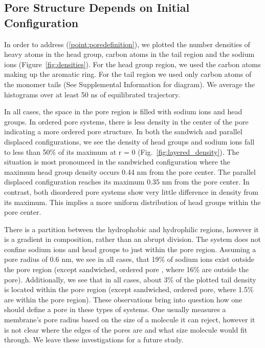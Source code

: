 \documentclass{article}
\begin{document}
  \subsection{Pore Structure Depends on Initial Configuration}  %

  In order to address (\ref{point:poredefinition}), we plotted the number
  densities of heavy atoms in the head group, carbon atoms in the tail region
  and the sodium ions (Figure~\ref{fig:densities}). For the head group region,
  we used the carbon atoms making up the aromatic ring. For the tail region we
  used only carbon atoms of the monomer tails (See Supplemental Information for
  diagram). We average the histograms over at least 50 ns of equilibrated trajectory.

  In all cases, the space in the pore region is filled with sodium ions and
  head groups. In ordered pore systems, there is less density in the center of
  the pore indicating a more ordered pore structure. In both the sandwich and
  parallel displaced configurations, we see the density of head groups and sodium
  ions fall to less than 50\% of its maximum at r = 0
  (Fig.~\ref{fig:layered_density}). The situation is most pronounced in the
  sandwiched configuration where the maximum head group density occurs 0.44 nm
  from the pore center. The parallel displaced configuration reaches its maximum
  0.35 nm from the pore center. In contrast, both disordered pore systems show
  very little difference in density from its maximum. This implies a more uniform
  distribution of head groups within the pore center. 

  There is a partition between the hydrophobic and hydrophilic regions, however
  it is a gradient in composition, rather than an abrupt division. The system
  does not confine sodium ions and head groups to just within the pore region.
  Assuming a pore radius of 0.6 nm, we see in all cases, that 19\% of sodium ions
  exist outside the pore region (except sandwiched, ordered pore , where 16\%
  are outside the pore). Additionally, we see that in all cases, about 3\% of the
  plotted tail density is located within the pore region (except sandwiched,
  ordered pore, where 1.5\% are within the pore region). These observations bring
  into question how one should define a pore in these types of systems. One
  usually measures a membrane's pore radius based on the size of a molecule it
  can reject, however it is not clear where the edges of the pores are and what
  size molecule would fit through. We leave these investigations for a future
  study.
\end{document}
